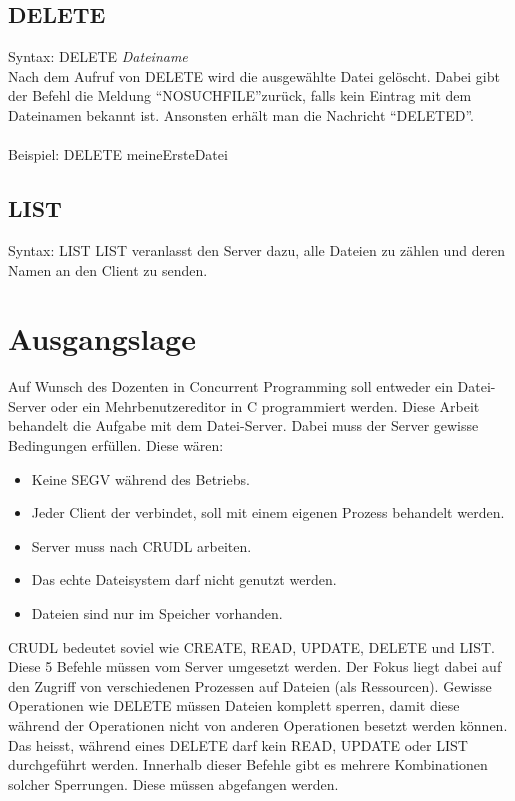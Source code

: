 \documentclass[12pt,a4paper,ngerman]{report}
\begin{document}
\section{DELETE}
Syntax: DELETE \textit{Dateiname}\\
Nach dem Aufruf von DELETE wird die ausgewählte Datei gelöscht. Dabei gibt der Befehl die Meldung \textquotedblleft NOSUCHFILE\textquotedblright zurück, falls kein Eintrag mit dem Dateinamen bekannt ist. Ansonsten erhält man die Nachricht \textquotedblleft DELETED\textquotedblright . \\
\\
Beispiel: DELETE meineErsteDatei
\section{LIST}
Syntax: LIST
LIST veranlasst den Server dazu, alle Dateien zu zählen und deren Namen an den Client zu senden.
\chapter{Ausgangslage}
Auf Wunsch des Dozenten in Concurrent Programming soll entweder ein Datei-Server oder ein Mehrbenutzereditor in C programmiert werden. Diese Arbeit behandelt die Aufgabe mit dem Datei-Server. Dabei muss der Server gewisse Bedingungen erfüllen. Diese wären:
\begin{itemize}
	\item Keine SEGV während des Betriebs.
	\item Jeder Client der verbindet, soll mit einem eigenen Prozess behandelt werden.
	\item Server muss nach CRUDL arbeiten.
	\item Das echte Dateisystem darf nicht genutzt werden.
	\item Dateien sind nur im Speicher vorhanden.
\end{itemize}

CRUDL bedeutet soviel wie CREATE, READ, UPDATE, DELETE und LIST. Diese 5 Befehle müssen vom Server umgesetzt werden. Der Fokus liegt dabei auf den Zugriff von verschiedenen Prozessen auf Dateien (als Ressourcen). Gewisse Operationen wie DELETE müssen Dateien komplett sperren, damit diese während der Operationen nicht von anderen Operationen besetzt werden können. Das heisst, während eines DELETE darf kein READ, UPDATE oder LIST durchgeführt werden. Innerhalb dieser Befehle gibt es mehrere Kombinationen solcher Sperrungen. Diese müssen abgefangen werden.
\end{document}
